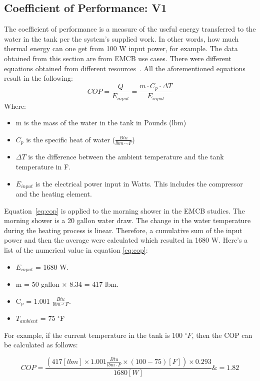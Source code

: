 \subsection{Coefficient of Performance: V1}
The coefficient of performance is a measure of the useful energy transferred to the water in the tank per the system's supplied work. In other words, how much thermal energy can one get from 100 W input power, for example. The data obtained from this section are from EMCB use cases. There were different equations obtained from different resources~\cite{LeightonClarke,r1,Hudon}. All the aforementioned equations result in the following:
\begin{equation}\label{eq:cop}
    COP = \frac{Q}{E_{input}} = \frac{m \cdot C_{p} \cdot \Delta T}{E_{input}}
\end{equation}
Where:
\begin{itemize}
    \item m is the mass of the water in the tank in Pounds (lbm)
    \item $C_{p}$ is the specific heat of water ($\frac{Btu}{lbm \cdot \circ F}$)
    \item $\Delta T$ is the difference between the ambient temperature and the tank temperature in F.
    \item $E_{input}$ is the electrical power input in Watts. This includes the compressor and the heating element.
\end{itemize}

Equation~\ref{eq:cop} is applied to the morning shower in the EMCB studies. The morning shower is a 20 gallon water draw. The change in the water temperature during the heating process is linear. Therefore, a cumulative sum of the input power and then the average were calculated which resulted in 1680 W. Here's a list of the numerical value in equation \ref{eq:cop}:
\begin{itemize}
    \item $E_{input}$ = 1680 W.
    \item m = 50 gallon $\times$ 8.34 = 417 lbm.
    \item C$_{p}$ = 1.001 $\frac{Btu}{lbm \cdot ^{\circ}F}$.
    \item $T_{ambient}$ = 75 $^{\circ}$F
\end{itemize}

For example, if the current temperature in the tank is 100 $^{\circ}F$, then the COP can be calculated as follows:

\begin{equation}
    COP = \frac{(417 [lbm] \times 1.001 \frac{Btu}{lbm \cdot F} \times (100 - 75) [F]) \times 0.293 }{1680 [W]}
    \&=1.82
\end{equation}

